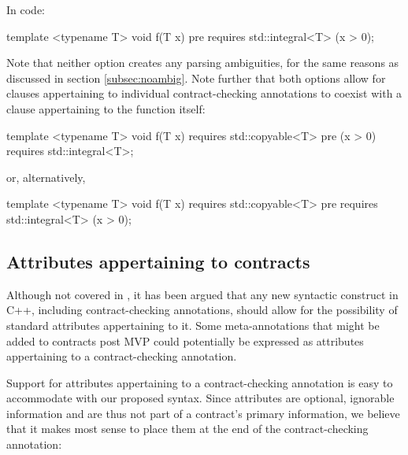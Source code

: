 In code:

\begin{codeblock}
template <typename T>
void f(T x)
  pre requires std::integral<T> (x > 0);
\end{codeblock}

Note that neither option creates any parsing ambiguities, for the same reasons as discussed in section \ref{subsec:noambig}. Note further that both options allow for  clauses appertaining to individual contract-checking annotations to coexist with a  clause appertaining to the function itself:

\begin{codeblock}
template <typename T>
void f(T x)
  requires std::copyable<T>
  pre (x > 0) requires std::integral<T>;
\end{codeblock}

or, alternatively,

\begin{codeblock}
template <typename T>
void f(T x)
  requires std::copyable<T>
  pre requires std::integral<T> (x > 0);
\end{codeblock}


\subsection{Attributes appertaining to contracts}
\label{subsec:attr}

Although not covered in \cite{P2885R3}, it has been argued that any new syntactic construct in C++, including contract-checking annotations, should allow for the possibility of standard attributes appertaining to it. Some meta-annotations that might be added to contracts post MVP could potentially be expressed as attributes appertaining to a contract-checking annotation.

Support for attributes appertaining to a contract-checking annotation is easy to accommodate with our proposed syntax. Since attributes are optional, ignorable information and are thus not part of a contract's primary information, we believe that it makes most sense to place them at the end of the contract-checking annotation:

